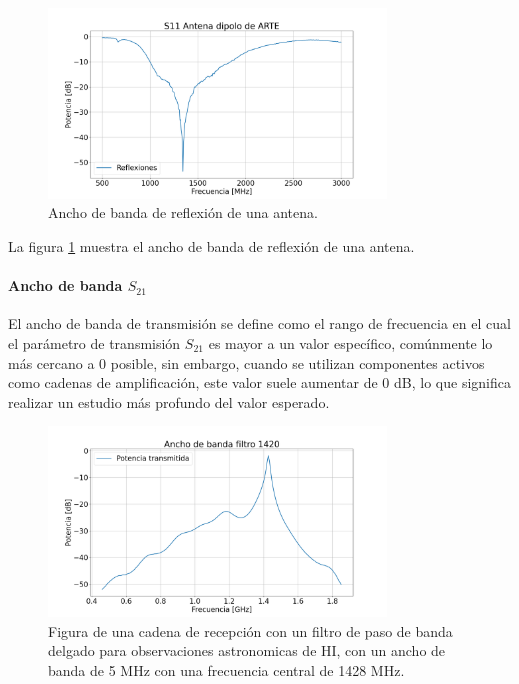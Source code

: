 \begin{figure}
    \centering
    \includegraphics[width = 0.8\textwidth]{img/s11Arte}
    \caption{Ancho de banda de reflexión de una antena.}
    \label{fig:bandwidth}
\end{figure}

La figura \ref{fig:bandwidth} muestra el ancho de banda de reflexión de una antena.\\

\paragraph{Ancho de banda $S_{21}$} El ancho de banda de transmisión se define como el rango de frecuencia en el cual el parámetro de transmisión $S_{21}$ es mayor a un valor específico, comúnmente lo más cercano a 0 posible, sin embargo, cuando se utilizan componentes activos como cadenas de amplificación, este valor suele aumentar de 0 dB, lo que significa realizar un estudio más profundo del valor esperado.\\

\begin{figure}
    \centering
    \includegraphics[width = 0.8\textwidth]{img/s21Fh1}
    \caption{Figura de una cadena de recepción con un filtro de paso de banda delgado para observaciones astronomicas de HI, con un ancho de banda de 5 MHz con una frecuencia central de 1428 MHz.}
    \label{fig:bandwidth2}
\end{figure}

